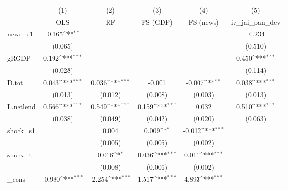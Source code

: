 {
\def\sym#1{\ifmmode^{#1}\else\(^{#1}\)\fi}
\begin{tabular}{l*{5}{c}}
\toprule
            &\multicolumn{1}{c}{(1)}&\multicolumn{1}{c}{(2)}&\multicolumn{1}{c}{(3)}&\multicolumn{1}{c}{(4)}&\multicolumn{1}{c}{(5)}\\
            &\multicolumn{1}{c}{OLS}&\multicolumn{1}{c}{RF}&\multicolumn{1}{c}{FS (GDP)}&\multicolumn{1}{c}{FS (news)}&\multicolumn{1}{c}{iv\_jai\_pan\_dev}\\
\midrule
news\_s1     &      -0.165\sym{**} &                     &                     &                     &      -0.234         \\
            &     (0.065)         &                     &                     &                     &     (0.510)         \\
\addlinespace
gRGDP       &       0.192\sym{***}&                     &                     &                     &       0.450\sym{***}\\
            &     (0.028)         &                     &                     &                     &     (0.114)         \\
\addlinespace
D.tot       &       0.043\sym{***}&       0.036\sym{***}&      -0.001         &      -0.007\sym{**} &       0.038\sym{***}\\
            &     (0.013)         &     (0.012)         &     (0.008)         &     (0.003)         &     (0.013)         \\
\addlinespace
L.netlend   &       0.566\sym{***}&       0.549\sym{***}&       0.159\sym{***}&       0.032         &       0.510\sym{***}\\
            &     (0.038)         &     (0.049)         &     (0.042)         &     (0.020)         &     (0.063)         \\
\addlinespace
shock\_s1    &                     &       0.004         &       0.009\sym{*}  &      -0.012\sym{***}&                     \\
            &                     &     (0.005)         &     (0.005)         &     (0.002)         &                     \\
\addlinespace
shock\_t     &                     &       0.016\sym{*}  &       0.036\sym{***}&       0.011\sym{***}&                     \\
            &                     &     (0.008)         &     (0.006)         &     (0.002)         &                     \\
\addlinespace
\_cons      &      -0.980\sym{***}&      -2.254\sym{***}&       1.517\sym{***}&       4.893\sym{***}&                     \\

\end{tabular}}
